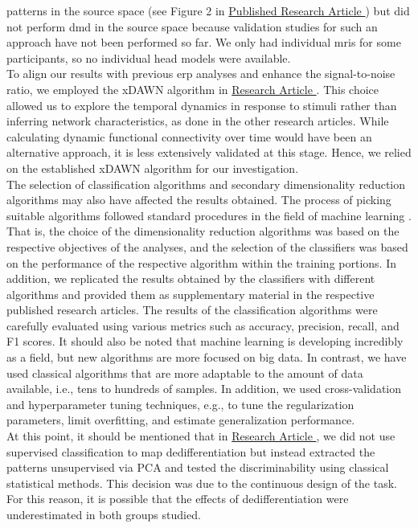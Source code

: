 patterns in the source space (see Figure 2 in \hyperref[pub:paperIII]{Published Research Article }) but did not perform \gls{dmd} in the source space because validation studies for such an approach have not been performed so far. We only had individual \glspl{mri} for some participants, so no individual head models were available.\\
To align our results with previous \gls{erp} analyses and enhance the signal-to-noise ratio, we employed the xDAWN algorithm in \hyperref[results:paperIV]{Research Article }. This choice allowed us to explore the temporal dynamics in response to stimuli rather than inferring network characteristics, as done in the other research articles. While calculating dynamic functional connectivity over time would have been an alternative approach, it is less extensively validated at this stage. Hence, we relied on the established xDAWN algorithm for our investigation.\\
The selection of classification algorithms and secondary dimensionality reduction algorithms may also have affected the results obtained. The process of picking suitable algorithms followed standard procedures in the field of machine learning \cite{Shalev2014}. That is, the choice of the dimensionality reduction algorithms was based on the respective objectives of the analyses, and the selection of the classifiers was based on the performance of the respective algorithm within the training portions. In addition, we replicated the results obtained by the classifiers with different algorithms and provided them as supplementary material in the respective published research articles. The results of the classification algorithms were carefully evaluated using various metrics such as accuracy, precision, recall, and F1 scores. It should also be noted that machine learning is developing incredibly as a field, but new algorithms are more focused on big data.  In contrast, we have used classical algorithms that are more adaptable to the amount of data available, i.e., tens to hundreds of samples. In addition, we used cross-validation and hyperparameter tuning techniques, e.g., to tune the regularization parameters, limit overfitting, and estimate generalization performance.\\
At this point, it should be mentioned that in \hyperref[results:paperIII]{Research Article }, we did not use supervised classification to map dedifferentiation but instead extracted the patterns unsupervised via PCA and tested the discriminability using classical statistical methods. This decision was due to the continuous design of the task. For this reason, it is possible that the effects of dedifferentiation were underestimated in both groups studied.\\
